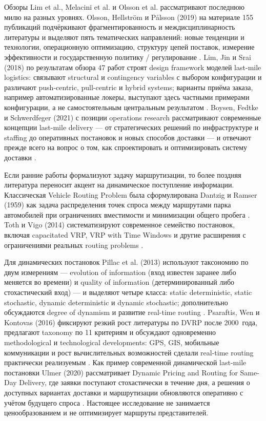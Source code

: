 \documentclass[14pt,a4paper]{extarticle}
\begin{document}
Обзоры Lim et al., Melacini et al. и Olsson et al. рассматривают последнюю милю на разных уровнях. Olsson, Hellström и Pålsson (2019) на материале 155 публикаций подчёркивают фрагментированность и междисциплинарность литературы и выделяют пять тематических направлений: новые тенденции и технологии, операционную оптимизацию, структуру цепей поставок, измерение эффективности и государственную политику / регулирование \cite{olsson2019}. Lim, Jin и Srai (2018) по результатам обзора 47 работ строят design framework моделей last-mile logistics: связывают structural и contingency variables с выбором конфигурации и различают push-centric, pull-centric и hybrid systems; варианты приёма заказа, например автоматизированные локеры, выступают здесь частными примерами конфигурации, а не самостоятельным центральным результатом \cite{lim2018}. Boysen, Fedtke и Schwerdfeger (2021) с позиции operations research рассматривают современные концепции last-mile delivery --- от стратегических решений по инфраструктуре и staffing до оперативных постановок и новых способов доставки --- и отвечают прежде всего на вопрос о том, как спроектировать и оптимизировать систему доставки \cite{boysen2021}.

Если ранние работы формализуют задачу маршрутизации, то более поздняя литература переносит акцент на динамическое поступление информации. Классическая Vehicle Routing Problem была сформулирована Dantzig и Ramser (1959) как задача распределения точек спроса между маршрутами парка автомобилей при ограничениях вместимости и минимизации общего пробега \cite{dantzig1959}. Toth и Vigo (2014) систематизируют современное семейство постановок, включая capacitated VRP, VRP with Time Windows и другие расширения с ограничениями реальных routing problems \cite{toth2014}.

Для динамических постановок Pillac et al. (2013) используют таксономию по двум измерениям --- evolution of information (вход известен заранее либо меняется во времени) и quality of information (детерминированный либо стохастический вход) --- и выделяют четыре класса: static deterministic, static stochastic, dynamic deterministic и dynamic stochastic; дополнительно обсуждаются degree of dynamism и развитие real-time routing \cite{pillac2013}. Psaraftis, Wen и Kontovas (2016) фиксируют резкий рост литературы по DVRP после 2000~года, предлагают taxonomy по 11 критериям и обсуждают одновременно methodological и technological developments: GPS, GIS, мобильные коммуникации и рост вычислительных возможностей сделали real-time routing практически реализуемым \cite{psaraftis2016}. Как пример современной динамической last-mile постановки Ulmer (2020) рассматривает Dynamic Pricing and Routing for Same-Day Delivery, где заявки поступают стохастически в течение дня, а решения о доступных вариантах доставки и маршрутизации обновляются оперативно с учётом будущего спроса \cite{ulmer2020}. Настоящее исследование не занимается ценообразованием и не оптимизирует маршруты представителей.
\end{document}
